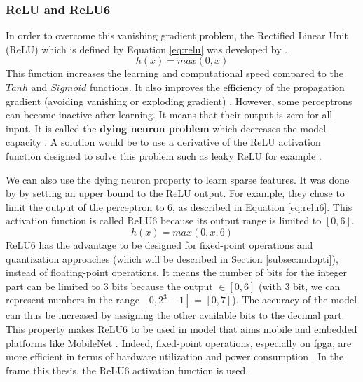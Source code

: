 \subsubsection{ReLU and ReLU6}
In order to overcome this vanishing gradient problem, the Rectified Linear Unit (ReLU) which is defined by Equation \eqref{eq:relu} was developed by \textcite{krizhevsky_imagenet_2012}.
%
\begin{equation}
    h(x) = max(0, x)
    \label{eq:relu}
\end{equation}
%
This function increases the learning and computational speed compared to the $Tanh$ and $Sigmoid$ functions. It also improves the efficiency of the propagation gradient (avoiding vanishing or exploding gradient) \cite{abdelouahab_accelerating_2018, maas_rectier_2013}. However, some perceptrons can become inactive after learning. It means that their output is zero for all input. It is called the \textbf{dying neuron problem} which decreases the model capacity \cite{matteucci_artificial_2019}. A solution would be to use a derivative of the ReLU activation function designed to solve this problem such as leaky ReLU for example \cite{matteucci_artificial_2019, maas_rectier_2013}.

We can also use the dying neuron property to learn sparse features. It was done by \textcite{krizhevsky_convolutional_2010} by setting an upper bound to the ReLU output. For example, they chose to limit the output of the perceptron to 6, as described in Equation \eqref{eq:relu6}. This activation function is called ReLU6 because its output range is limited to $[0, 6]$. 
%
\begin{equation}
    h(x) = max(0, x, 6)
    \label{eq:relu6}
\end{equation}
%
ReLU6 has the advantage to be designed for fixed-point operations and quantization approaches (which will be described in Section \ref{subsec:mdopti}), instead of floating-point operations. It means the number of bits for the integer part can be limited to 3 bits because the output $ \in [0, 6]$ (with 3 bit, we can represent numbers in the range $[0, 2^3-1]$ = $[0, 7]$). The accuracy of the model can thus be increased by assigning the other available bits to the decimal part. This property makes ReLU6 to be used in model that aims mobile and embedded platforms like MobileNet \cite{howard_mobilenets_2017}. Indeed, fixed-point operations, especially on \acrshort{fpga}, are more efficient in terms of hardware utilization and power consumption \cite{david_hardware_2007}. In the frame this thesis, the ReLU6 activation function is used.

